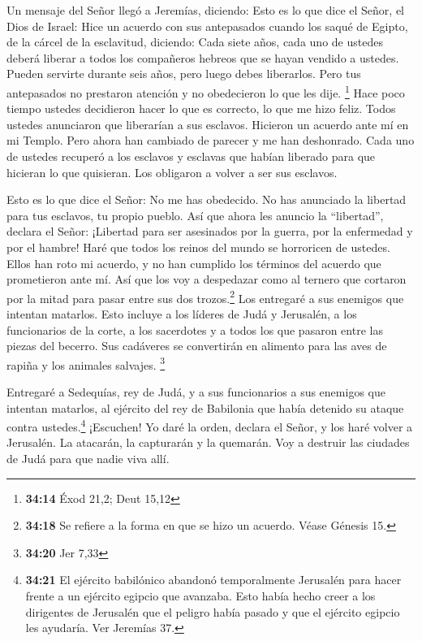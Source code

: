  Un mensaje del Señor llegó a Jeremías, diciendo:
 Esto es lo que dice el Señor, el Dios de Israel: Hice un
acuerdo con sus antepasados cuando los saqué de Egipto, de la cárcel de
la esclavitud, diciendo:  Cada siete años, cada uno de
ustedes deberá liberar a todos los compañeros hebreos que se hayan
vendido a ustedes. Pueden servirte durante seis años, pero luego debes
liberarlos. Pero tus antepasados no prestaron atención y no obedecieron
lo que les dije. \footnote{\textbf{34:14} Éxod 21,2; Deut 15,12}
 Hace poco tiempo ustedes decidieron hacer lo que es
correcto, lo que me hizo feliz. Todos ustedes anunciaron que liberarían
a sus esclavos. Hicieron un acuerdo ante mí en mi Templo.
 Pero ahora han cambiado de parecer y me han deshonrado.
Cada uno de ustedes recuperó a los esclavos y esclavas que habían
liberado para que hicieran lo que quisieran. Los obligaron a volver a
ser sus esclavos.

 Esto es lo que dice el Señor: No me has obedecido. No
has anunciado la libertad para tus esclavos, tu propio pueblo. Así que
ahora les anuncio la ``libertad'', declara el Señor: ¡Libertad para ser
asesinados por la guerra, por la enfermedad y por el hambre! Haré que
todos los reinos del mundo se horroricen de ustedes. 
Ellos han roto mi acuerdo, y no han cumplido los términos del acuerdo
que prometieron ante mí. Así que los voy a despedazar como al ternero
que cortaron por la mitad para pasar entre sus dos trozos.\footnote{\textbf{34:18}
  Se refiere a la forma en que se hizo un acuerdo. Véase Génesis 15.}
 Los entregaré a sus enemigos que intentan matarlos. Esto
incluye a los líderes de Judá y Jerusalén, a los funcionarios de la
corte, a los sacerdotes y a todos los que pasaron entre las piezas del
becerro.  Sus cadáveres se convertirán en alimento para
las aves de rapiña y los animales salvajes. \footnote{\textbf{34:20} Jer
  7,33}

 Entregaré a Sedequías, rey de Judá, y a sus funcionarios
a sus enemigos que intentan matarlos, al ejército del rey de Babilonia
que había detenido su ataque contra ustedes.\footnote{\textbf{34:21} El
  ejército babilónico abandonó temporalmente Jerusalén para hacer frente
  a un ejército egipcio que avanzaba. Esto había hecho creer a los
  dirigentes de Jerusalén que el peligro había pasado y que el ejército
  egipcio les ayudaría. Ver Jeremías 37.}  ¡Escuchen! Yo
daré la orden, declara el Señor, y los haré volver a Jerusalén. La
atacarán, la capturarán y la quemarán. Voy a destruir las ciudades de
Judá para que nadie viva allí.

